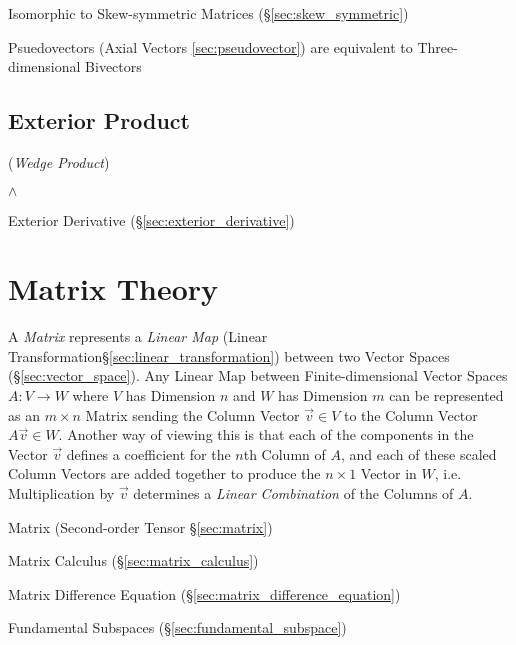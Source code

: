 Isomorphic to Skew-symmetric Matrices (\S\ref{sec:skew_symmetric})

Psuedovectors (Axial Vectors \ref{sec:pseudovector}) are equivalent to
Three-dimensional Bivectors



\subsection{Exterior Product}\label{sec:exterior_product}

(\emph{Wedge Product})

$\wedge$

\fist Exterior Derivative (\S\ref{sec:exterior_derivative})



\section{Matrix Theory}\label{sec:matrix_theory}


A \emph{Matrix} represents a \emph{Linear Map} (Linear
Transformation\S\ref{sec:linear_transformation}) between two Vector Spaces
(\S\ref{sec:vector_space}). Any Linear Map between Finite-dimensional Vector
Spaces $A : V \rightarrow W$ where $V$ has Dimension $n$ and $W$ has Dimension
$m$ can be represented as an $m \times n$ Matrix sending the Column Vector
$\vec{v} \in V$ to the Column Vector $A\vec{v} \in W$. Another way of viewing
this is that each of the components in the Vector $\vec{v}$ defines a
coefficient for the $n$th Column of $A$, and each of these scaled Column
Vectors are added together to produce the $n \times 1$ Vector in $W$, i.e.
Multiplication by $\vec{v}$ determines a \emph{Linear Combination} of the
Columns of $A$.

\fist Matrix (Second-order Tensor \S\ref{sec:matrix})

\fist Matrix Calculus (\S\ref{sec:matrix_calculus})

\fist Matrix Difference Equation (\S\ref{sec:matrix_difference_equation})

\fist Fundamental Subspaces (\S\ref{sec:fundamental_subspace})

